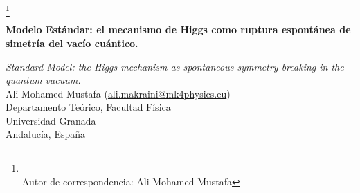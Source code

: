 \documentclass[twoside]{article}
\theoremstyle{definition}
\theoremstyle{remark}
\numberwithin{equation}{section}
\theoremstyle{definition}
\theoremstyle{example}
\theoremstyle{remark}
\numberwithin{equation}{section}%
\begin{document}
		\label{begin-art}
		\pagestyle{headings}
		\thispagestyle{plain} 
		\footnote{\hspace{-18.1pt}\\ Autor de correspondencia: Ali Mohamed Mustafa}
		\begin{center}
			{\LARGE\bfseries Modelo Estándar: el mecanismo de Higgs como ruptura espontánea de simetría del vacío cuántico. \par }
			
			\vspace{3mm}
			{\large\slshape Standard Model: the Higgs mechanism as spontaneous symmetry breaking in the quantum vacuum.}\\[5mm]
			{\large Ali Mohamed Mustafa (\url{ali.makraini@mk4physics.eu})}\\
			Departamento Teórico, Facultad Física \\
			Universidad Granada\\
			Andalucía, España
			
		\end{center}
		
		\begin{abstract}
			Se presenta una simulación del acoplamiento entre el campo de Higgs (\(\Phi\)), la densidad del Vacío Absoluto/Espacio-Tiempo (\(\varrho\)) y una curvatura emergente interpretada como gravedad. El modelo permite ajustar parámetros físicos clave para evaluar el origen de la masa del Higgs.
			Se propone que dicha masa no surge por ruptura espontánea de simetría en el vacío cuántico, sino por interacción directa con el Vacío Absoluto, anterior a la estructura espacio-temporal.
			
			
			\textbf{Palabras clave:} Vacío Absoluto, campo de Higgs, densidad cuántica, gravedad emergente, ruptura de simetría.
		\end{abstract}
		
		
		
		\begin{abstract}
			We present a simulation of the coupling between the Higgs field (\(\Phi\)), the density of the Absolute Vacuum/Space-Time (\(\varrho\)), and an emergent curvature interpreted as gravitational. The model allows variation of key physical parameters.
			
			We argue that the Higgs field does not acquire mass via spontaneous symmetry breaking in the quantum vacuum, but rather through direct interaction with the Absolute Vacuum, which lacks space-time structure.
			
			\textbf{Keywords:} Absolute Vacuum, Higgs field, quantum density, emergent gravity, symmetry breaking.
		\end{abstract}
		
\end{document}
